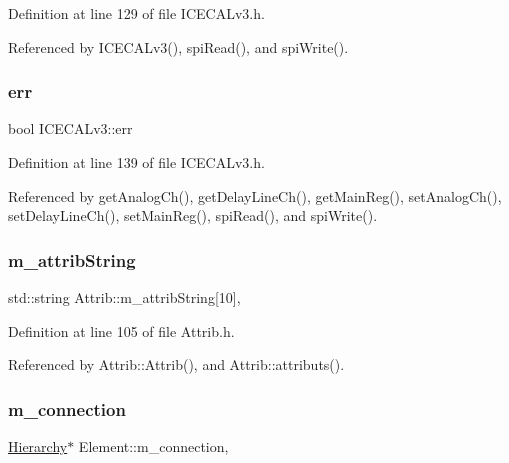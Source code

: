 Definition at line 129 of file I\+C\+E\+C\+A\+Lv3.\+h.



Referenced by I\+C\+E\+C\+A\+Lv3(), spi\+Read(), and spi\+Write().

\mbox{\label{classICECALv3_ad8989925ee5b3ff322d863ce6aaff0bd}} 
\subsubsection{\texorpdfstring{err}{err}}
{\footnotesize\ttfamily bool I\+C\+E\+C\+A\+Lv3\+::err\hspace{0.3cm}{\ttfamily [private]}}



Definition at line 139 of file I\+C\+E\+C\+A\+Lv3.\+h.



Referenced by get\+Analog\+Ch(), get\+Delay\+Line\+Ch(), get\+Main\+Reg(), set\+Analog\+Ch(), set\+Delay\+Line\+Ch(), set\+Main\+Reg(), spi\+Read(), and spi\+Write().

\mbox{\label{classAttrib_a3414521d7a82476e874b25a5407b5e63}} 
\subsubsection{\texorpdfstring{m\+\_\+attrib\+String}{m\_attribString}}
{\footnotesize\ttfamily std\+::string Attrib\+::m\+\_\+attrib\+String\mbox{[}10\mbox{]}\hspace{0.3cm}{\ttfamily [protected]}, {\ttfamily [inherited]}}



Definition at line 105 of file Attrib.\+h.



Referenced by Attrib\+::\+Attrib(), and Attrib\+::attributs().

\mbox{\label{classElement_abe3de7a5dbbc9a6dd2d7e012e5fdb266}} 
\subsubsection{\texorpdfstring{m\+\_\+connection}{m\_connection}}
{\footnotesize\ttfamily \hyperlink{classHierarchy}{Hierarchy}$\ast$ Element\+::m\+\_\+connection\hspace{0.3cm}{\ttfamily [protected]}, {\ttfamily [inherited]}}



